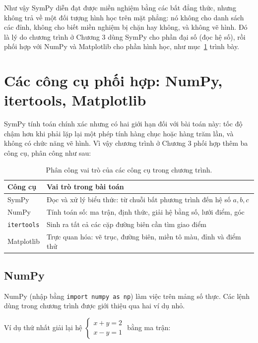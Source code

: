 \documentclass[12pt,a4paper]{report}
\begin{document}
\begin{notebox}
Như vậy SymPy diễn đạt được miền nghiệm bằng các bất đẳng thức, nhưng không trả về một đối tượng hình học trên mặt phẳng: nó không cho danh sách các đỉnh, không cho biết miền nghiệm bị chặn hay không, và không vẽ hình. Đó là lý do chương trình ở Chương 3 dùng SymPy cho phần đại số (đọc hệ số), rồi phối hợp với NumPy và Matplotlib cho phần hình học, như mục~\ref{sec:2.10} trình bày.
\end{notebox}

\section{Các công cụ phối hợp: NumPy, itertools, Matplotlib}
\label{sec:2.10}

SymPy tính toán chính xác nhưng có hai giới hạn đối với bài toán này: tốc độ chậm hơn khi phải lặp lại một phép tính hàng chục hoặc hàng trăm lần, và không có chức năng vẽ hình. Vì vậy chương trình ở Chương 3 phối hợp thêm ba công cụ, phân công như sau:

\begin{table}[htbp]
\centering
\small
\begin{tabular}{@{}p{3cm}p{10cm}@{}}
\toprule
Công cụ & Vai trò trong bài toán \\
\midrule
SymPy & Đọc và xử lý biểu thức: từ chuỗi bất phương trình đến hệ số $a,b,c$ \\
 NumPy & Tính toán số: ma trận, định thức, giải hệ bằng số, lưới điểm, góc \\
\texttt{itertools} & Sinh ra tất cả các cặp đường biên cần tìm giao điểm \\
Matplotlib & Trực quan hóa: vẽ trục, đường biên, miền tô màu, đỉnh và điểm thử \\
\bottomrule
\end{tabular}
\caption{Phân công vai trò của các công cụ trong chương trình.}
\label{tab:phan-cong}
\end{table}

\subsection*{NumPy}

NumPy (nhập bằng \texttt{import numpy as np}) làm việc trên mảng số thực. Các lệnh dùng trong chương trình được giới thiệu qua hai ví dụ nhỏ.

Ví dụ thứ nhất giải lại hệ $\begin{cases}x+y=2\\x-y=1\end{cases}$ bằng ma trận:
\end{document}
